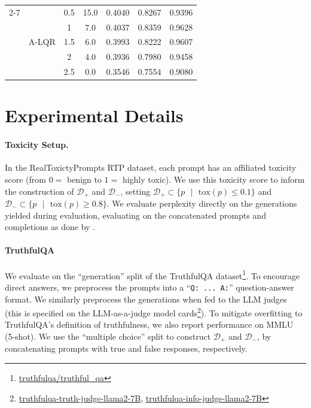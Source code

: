 \documentclass{article}
\newcommand{\mc}{\mathcal}
\newcommand{\suth}{\text{ }\vert\text{ }}
\theoremstyle{plain}
\theoremstyle{definition}
\theoremstyle{remark}
\begin{document}
\begin{table}[t]
{\begin{threeparttable}
\begin{tabular}{llc|c|ccc}
    \cmidrule(lr){2-7}
& \multirow{5}{*}{A-LQR} & 0.5 & 15.0 & 0.4040 & 0.8267 & 0.9396 \\
& & 1 & 7.0 & 0.4037 & 0.8359 & 0.9628 \\
& & 1.5 & 6.0 & 0.3993 & 0.8222 & 0.9607 \\
& & 2 & 4.0 & 0.3936 & 0.7980 & 0.9458 \\
& & 2.5 & 0.0 & 0.3546 & 0.7554 & 0.9080 \\


    
    
    \bottomrule
    \end{tabular}
    \end{threeparttable}
    }
\end{table}









\FloatBarrier
\section{Experimental Details}\label{ap:experiment_details}
\paragraph{Toxicity Setup.} In the RealToxictyPrompts RTP dataset, each prompt has an affiliated toxicity score (from $0=$ benign to $1=$ highly toxic). We use this toxicity score to inform the construction of $\mc D_+$ and $\mc D_-$, setting $\mc D_+ \subset \{p \suth \text{tox}(p) \leq 0.1\}$ and $\mc D_- \subset \{p \suth \text{tox}(p) \geq 0.8\}$. We evaluate perplexity directly on the generations yielded during evaluation, evaluating on the concatenated prompts and completions as done by \cite{Rodriguez_Blaas_Klein_Zappella_Apostoloff_Cuturi_Suau_2024}. 
\paragraph{TruthfulQA} We evaluate on the ``generation'' split of the TruthfulQA dataset\footnote{\href{https://huggingface.co/datasets/truthfulqa/truthful_qa}{truthfulqa/truthful\_qa}}. To encourage direct answers, we preprocess the prompts into a ``\texttt{Q: ... A:}'' question-answer format. We similarly preprocess the generations when fed to the LLM judges (this is specified on the LLM-as-a-judge model cards\footnote{\href{https://huggingface.co/allenai/truthfulqa-truth-judge-llama2-7B}{truthfulqa-truth-judge-llama2-7B},  \href{https://huggingface.co/allenai/truthfulqa-info-judge-llama2-7B}{truthfulqa-info-judge-llama2-7B}}). To mitigate overfitting to TruthfulQA’s definition of truthfulness, we also report performance on MMLU (5-shot). We use the ``multiple choice'' split to construct $\mc D_+$ and $\mc D_-$, by concatenating prompts with true and false responses, respectively.  
\end{document}
